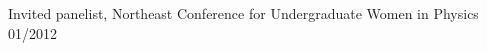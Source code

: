 \documentclass[12pt,letterpaper]{article}
\begin{document}
\begin{compactitem}[]
\item Invited panelist, Northeast Conference for Undergraduate Women in Physics \hfill 01/2012
\end{compactitem}
\end{document}

